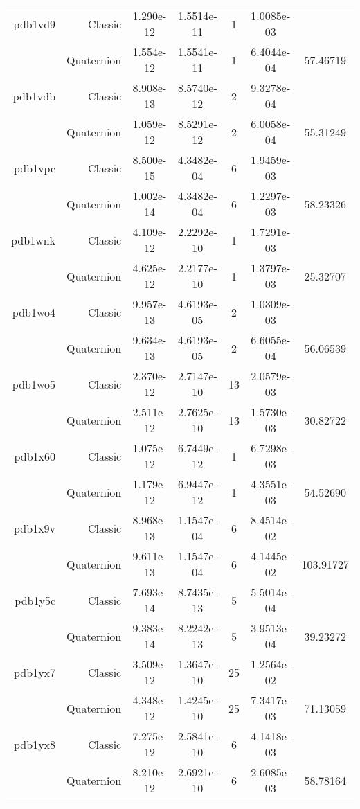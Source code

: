 \begin{xltabular}{\textwidth}{r|rS[table-format=1.3e+2]S[table-format=1.4e+2]cS[table-format=1.4e+2]S[table-format=-1.5]}
pdb1vd9 & Classic & 1.290e-12 & 1.5514e-11 & 1 & 1.0085e-03 & \\
& Quaternion & 1.554e-12 & 1.5541e-11 & 1 & 6.4044e-04 & 57.46719\\  \addlinespace
pdb1vdb & Classic & 8.908e-13 & 8.5740e-12 & 2 & 9.3278e-04 & \\
& Quaternion & 1.059e-12 & 8.5291e-12 & 2 & 6.0058e-04 & 55.31249\\  \addlinespace
pdb1vpc & Classic & 8.500e-15 & 4.3482e-04 & 6 & 1.9459e-03 & \\
& Quaternion & 1.002e-14 & 4.3482e-04 & 6 & 1.2297e-03 & 58.23326\\  \addlinespace
pdb1wnk & Classic & 4.109e-12 & 2.2292e-10 & 1 & 1.7291e-03 & \\
& Quaternion & 4.625e-12 & 2.2177e-10 & 1 & 1.3797e-03 & 25.32707\\  \addlinespace
pdb1wo4 & Classic & 9.957e-13 & 4.6193e-05 & 2 & 1.0309e-03 & \\
& Quaternion & 9.634e-13 & 4.6193e-05 & 2 & 6.6055e-04 & 56.06539\\  \addlinespace
pdb1wo5 & Classic & 2.370e-12 & 2.7147e-10 & 13 & 2.0579e-03 & \\
& Quaternion & 2.511e-12 & 2.7625e-10 & 13 & 1.5730e-03 & 30.82722\\  \addlinespace
pdb1x60 & Classic & 1.075e-12 & 6.7449e-12 & 1 & 6.7298e-03 & \\
& Quaternion & 1.179e-12 & 6.9447e-12 & 1 & 4.3551e-03 & 54.52690\\  \addlinespace
pdb1x9v & Classic & 8.968e-13 & 1.1547e-04 & 6 & 8.4514e-02 & \\
& Quaternion & 9.611e-13 & 1.1547e-04 & 6 & 4.1445e-02 & 103.91727\\  \addlinespace
pdb1y5c & Classic & 7.693e-14 & 8.7435e-13 & 5 & 5.5014e-04 & \\
& Quaternion & 9.383e-14 & 8.2242e-13 & 5 & 3.9513e-04 & 39.23272\\  \addlinespace
pdb1yx7 & Classic & 3.509e-12 & 1.3647e-10 & 25 & 1.2564e-02 & \\
& Quaternion & 4.348e-12 & 1.4245e-10 & 25 & 7.3417e-03 & 71.13059\\  \addlinespace
pdb1yx8 & Classic & 7.275e-12 & 2.5841e-10 & 6 & 4.1418e-03 & \\
& Quaternion & 8.210e-12 & 2.6921e-10 & 6 & 2.6085e-03 & 58.78164\\  \addlinespace

\end{xltabular}
